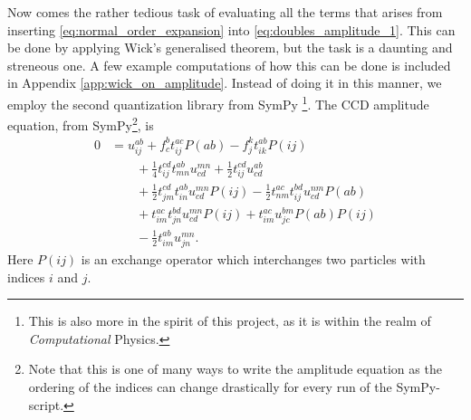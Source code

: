 \documentclass[
    a4paper, aps, twocolumn, floatfix, superscriptaddress,
    nofootinbib]{revtex4-1}
\newcommand{\1}{\mathds{1}}
\begin{document}
            Now comes the rather tedious task of evaluating all the terms that
            arises from inserting \autoref{eq:normal_order_expansion} into
            \autoref{eq:doubles_amplitude_1}. This can be done by applying
            Wick's generalised theorem, but the task is a daunting and streneous
            one. A few example computations of how this can be done is included
            in Appendix \ref{app:wick_on_amplitude}. Instead of doing it in this
            manner, we employ the second quantization library from SymPy
            \footnote{This is also more in the spirit of this project, as
            it is within the realm of \emph{Computational} Physics.}.  The CCD
            amplitude equation, from SymPy\footnote{Note that this is one of
            many ways to write the amplitude equation as the ordering of the
            indices can change drastically for every run of the SymPy-script.},
            is
            \begin{equation}
                \begin{aligned}
                    0 &= u^{ab}_{ij} + f^b_c t^{ac}_{ij}P(ab)
                    - f^k_jt^{ab}_{ik}P(ij)
                    \\
                    &\qquad
                    + \frac{1}{4}t^{cd}_{ij} t^{ab}_{mn} u^{mn}_{cd}
                    + \frac{1}{2}t^{cd}_{ij} u^{ab}_{cd}
                    \\
                    &\qquad
                    + \frac{1}{2}t^{cd}_{jm} t^{ab}_{in} u^{mn}_{cd} P(ij)
                    - \frac{1}{2}t^{ac}_{nm} t^{bd}_{ij} u^{nm}_{cd} P(ab)
                    \\
                    &\qquad
                    + t^{ac}_{im} t^{bd}_{jn} u^{mn}_{cd} P(ij)
                    + t^{ac}_{im} u^{bm}_{jc} P(ab) P(ij)
                    \\
                    &\qquad
                    - \frac{1}{2}t^{ab}_{im} u^{mn}_{jn}.
                    \label{eq:CCD_amp_1}
                \end{aligned}
            \end{equation}
            Here $P(ij)$ is an exchange operator which interchanges two
            particles with indices $i$ and $j$.
\end{document}
